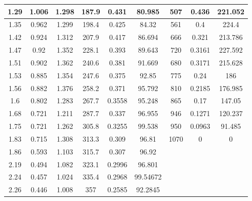 \begin{table*}[]
\begin{tabular}{|c|c|c|c|c|c|c|c|c|}
1.29        & 1.006        & 1.298      & 187.9      & 0.431      & 80.985       & 507        & 0.436       & 221.052      \\ \hline
1.35        & 0.962        & 1.299      & 198.4      & 0.425      & 84.32        & 561        & 0.4         & 224.4        \\ \hline
1.42        & 0.924        & 1.312      & 207.9      & 0.417      & 86.694       & 666        & 0.321       & 213.786      \\ \hline
1.47        & 0.92         & 1.352      & 228.1      & 0.393      & 89.643       & 720        & 0.3161      & 227.592      \\ \hline
1.51        & 0.902        & 1.362      & 240.6      & 0.381      & 91.669       & 680        & 0.3171      & 215.628      \\ \hline
1.53        & 0.885        & 1.354      & 247.6      & 0.375      & 92.85        & 775        & 0.24        & 186          \\ \hline
1.56        & 0.882        & 1.376      & 258.2      & 0.371      & 95.792       & 810        & 0.2185      & 176.985      \\ \hline
1.6         & 0.802        & 1.283      & 267.7      & 0.3558     & 95.248       & 865        & 0.17        & 147.05       \\ \hline
1.68        & 0.721        & 1.211      & 287.7      & 0.337      & 96.955       & 946        & 0.1271      & 120.237      \\ \hline
1.75        & 0.721        & 1.262      & 305.8      & 0.3255     & 99.538       & 950        & 0.0963      & 91.485       \\ \hline
1.83        & 0.715        & 1.308      & 313.3      & 0.309      & 96.81        & 1070       & 0           & 0            \\ \hline
1.86        & 0.593        & 1.103      & 315.7      & 0.307      & 96.92        & \multicolumn{3}{c|}{\multirow{12}{*}{}} \\ \cline{1-6}
2.19        & 0.494        & 1.082      & 323.1      & 0.2996     & 96.801       & \multicolumn{3}{c|}{}                   \\ \cline{1-6}
2.24        & 0.457        & 1.024      & 335.4      & 0.2968     & 99.54672     & \multicolumn{3}{c|}{}                   \\ \cline{1-6}
2.26        & 0.446        & 1.008      & 357        & 0.2585     & 92.2845      & \multicolumn{3}{c|}{}                   \\ \cline{1-6}

\end{tabular}
\end{table*}

